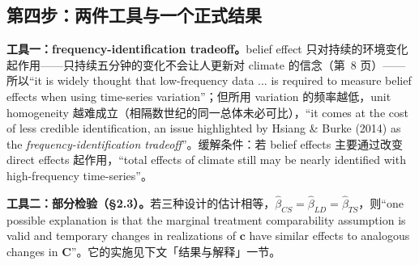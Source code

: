\subsection{第四步：两件工具与一个正式结果}

\textbf{工具一：frequency-identification tradeoff。}belief effect 只对持续的环境变化起作用——只持续五分钟的变化不会让人更新对 climate 的信念（第~8 页）——所以``it is widely thought that low-frequency data ... is required to measure belief effects when using time-series variation''\citep[第~8 页]{hsiang2016climate}；但所用 variation 的频率越低，unit homogeneity 越难成立（相隔数世纪的同一总体未必可比），``it comes at the cost of less credible identification, an issue highlighted by Hsiang \& Burke (2014) as the \emph{frequency-identification tradeoff}''\citep[第~8--9 页]{hsiang2016climate}。缓解条件：若 belief effects 主要通过改变 direct effects 起作用，``total effects of climate still may be nearly identified with high-frequency time-series''\citep[第~9 页]{hsiang2016climate}。

\textbf{工具二：部分检验（\S 2.3）。}若三种设计的估计相等，$\hat\beta_{CS}=\hat\beta_{LD}=\hat\beta_{TS}$，则``one possible explanation is that the marginal treatment comparability assumption is valid and temporary changes in realizations of $\mathbf{c}$ have similar effects to analogous changes in $\mathbf{C}$''\citep[第~9 页]{hsiang2016climate}。它的实施见下文「结果与解释」一节。

